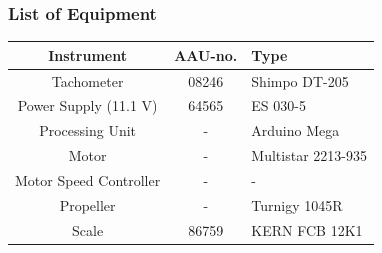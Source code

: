 \subsubsection{List of Equipment}
\begin{table}[H]
    \centering
	\begin{tabular}{|c|c|p{4.3cm}|}
		\hline%
		\textbf{Instrument}                                  &  \textbf{AAU-no.}  &  \textbf{Type}                       \\
		\hline%
		Tachometer                                           &  08246           &  Shimpo DT-205		                   \\
		\hline%
	    Power Supply (11.1 V) &  64565                   &  ES 030-5                 \\
		\hline%
		Processing Unit                                   &  -               & Arduino Mega     \\
		\hline%
		Motor                                   &  -               & Multistar 2213-935     \\
		\hline%
		Motor Speed Controller                                   &  -               &  -      \\
		\hline%
		Propeller                                   &  -               & Turnigy 1045R     \\
		\hline%
		Scale                                  &  86759              & KERN FCB 12K1     \\
		\hline%
		
	\end{tabular}
\end{table}

